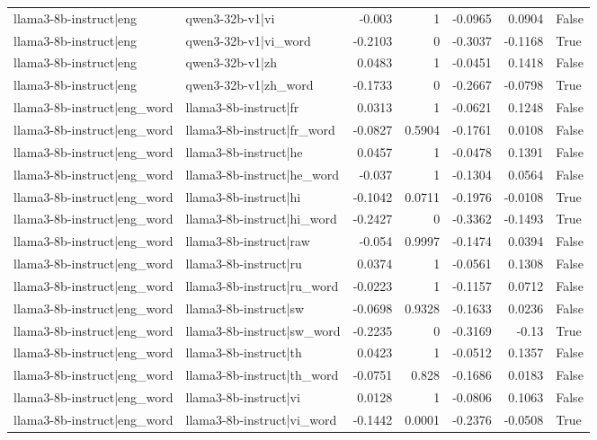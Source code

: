 \begin{table}
\begin{tabular}{l l r r r r l}
llama3-8b-instruct|eng & qwen3-32b-v1|vi & -0.003 & 1 & -0.0965 & 0.0904 & False \\
llama3-8b-instruct|eng & qwen3-32b-v1|vi_word & -0.2103 & 0 & -0.3037 & -0.1168 & True \\
llama3-8b-instruct|eng & qwen3-32b-v1|zh & 0.0483 & 1 & -0.0451 & 0.1418 & False \\
llama3-8b-instruct|eng & qwen3-32b-v1|zh_word & -0.1733 & 0 & -0.2667 & -0.0798 & True \\
llama3-8b-instruct|eng_word & llama3-8b-instruct|fr & 0.0313 & 1 & -0.0621 & 0.1248 & False \\
llama3-8b-instruct|eng_word & llama3-8b-instruct|fr_word & -0.0827 & 0.5904 & -0.1761 & 0.0108 & False \\
llama3-8b-instruct|eng_word & llama3-8b-instruct|he & 0.0457 & 1 & -0.0478 & 0.1391 & False \\
llama3-8b-instruct|eng_word & llama3-8b-instruct|he_word & -0.037 & 1 & -0.1304 & 0.0564 & False \\
llama3-8b-instruct|eng_word & llama3-8b-instruct|hi & -0.1042 & 0.0711 & -0.1976 & -0.0108 & True \\
llama3-8b-instruct|eng_word & llama3-8b-instruct|hi_word & -0.2427 & 0 & -0.3362 & -0.1493 & True \\
llama3-8b-instruct|eng_word & llama3-8b-instruct|raw & -0.054 & 0.9997 & -0.1474 & 0.0394 & False \\
llama3-8b-instruct|eng_word & llama3-8b-instruct|ru & 0.0374 & 1 & -0.0561 & 0.1308 & False \\
llama3-8b-instruct|eng_word & llama3-8b-instruct|ru_word & -0.0223 & 1 & -0.1157 & 0.0712 & False \\
llama3-8b-instruct|eng_word & llama3-8b-instruct|sw & -0.0698 & 0.9328 & -0.1633 & 0.0236 & False \\
llama3-8b-instruct|eng_word & llama3-8b-instruct|sw_word & -0.2235 & 0 & -0.3169 & -0.13 & True \\
llama3-8b-instruct|eng_word & llama3-8b-instruct|th & 0.0423 & 1 & -0.0512 & 0.1357 & False \\
llama3-8b-instruct|eng_word & llama3-8b-instruct|th_word & -0.0751 & 0.828 & -0.1686 & 0.0183 & False \\
llama3-8b-instruct|eng_word & llama3-8b-instruct|vi & 0.0128 & 1 & -0.0806 & 0.1063 & False \\
llama3-8b-instruct|eng_word & llama3-8b-instruct|vi_word & -0.1442 & 0.0001 & -0.2376 & -0.0508 & True \\

\end{tabular}
\end{table}
